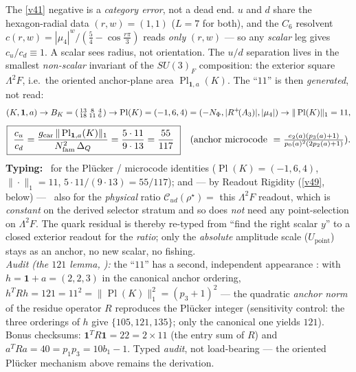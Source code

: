 \begin{keybox}
The \vref{v41} negative is a \emph{category error}, not a dead end. $u$ and $d$ share the hexagon-radial data
$(r,w)=(1,1)$ ($L=7$ for both), and the $C_6$ resolvent $c(r,w)=|\mu_4|^w/(\tfrac54-\cos\tfrac{r\pi}3)$
reads \emph{only} $(r,w)$ --- so any \emph{scalar} leg gives $c_u/c_d\equiv1$. A scalar sees radius, not
orientation. The $u/d$ separation lives in the smallest \emph{non-scalar} invariant of the $SU(3)_F$
composition: the exterior square $\Lambda^2F$, i.e.\ the oriented anchor-plane area
$\operatorname{Pl}_{\mathbf1,a}(K)$. The ``$11$'' is then \emph{generated}, not read:
\[
  (K,\mathbf1,a)\to B_K=\begin{psmallmatrix}13&8&4\\18&11&6\end{psmallmatrix}\to
  \operatorname{Pl}(K)=(-1,6,4)=(-N_\Phi,|R^+\!(A_3)|,|\mu_4|)\to
  \|\operatorname{Pl}(K)\|_1=11,
\]
\[
  \boxed{\ \frac{c_u}{c_d}=\frac{\gcar\,\|\operatorname{Pl}_{\mathbf1,a}(K)\|_1}{\Nfam^2\,\Delta_Q}
  =\frac{5\cdot11}{9\cdot13}=\frac{55}{117}\ }
  \quad(\text{anchor microcode }=\tfrac{e_2(a)(p_3(a)+1)}{p_0(a)^2(2p_2(a)+1)}).
\]
\textbf{Typing:} \mE\ for the Plücker / microcode identities ($\operatorname{Pl}(K)=(-1,6,4)$,
$\|\cdot\|_1=11$, $5\cdot11/(9\cdot13)=55/117$); and --- by Readout Rigidity (\vref{v49}, below) --- \mE\ also for the
\emph{physical} ratio $\mathcal C_{ud}(\rho^\star)=$ this $\Lambda^2F$ readout, which is \emph{constant} on the
derived selector stratum and so does \emph{not} need any point-selection on $\Lambda^2F$. The quark residual is
thereby re-typed from ``find the right scalar $y$'' to a closed exterior readout for the \emph{ratio}; only the
\emph{absolute} amplitude scale ($U_{\mathrm{point}}$) stays as an anchor, no new scalar, no fishing.
\smallskip\\
\noindent\emph{Audit (the $121$ lemma, ):} the ``$11$'' has a second,
independent appearance \mE: with $h=\mathbf1+a=(2,2,3)$ in the canonical anchor ordering,
$h^TRh=121=11^2=\|\operatorname{Pl}(K)\|_1^2=(p_3+1)^2$ --- the quadratic \emph{anchor norm} of the
residue operator $R$ reproduces the Plücker integer (sensitivity control: the three orderings of $h$
give $\{105,121,135\}$; only the canonical one yields $121$). Bonus checksums:
$\mathbf1^TR\mathbf1=22=2\times11$ (the entry sum of $R$) and $a^TRa=40=p_1p_3=10b_1-1$. Typed
\emph{audit}, not load-bearing --- the oriented Plücker mechanism above remains the derivation.

\end{keybox}
